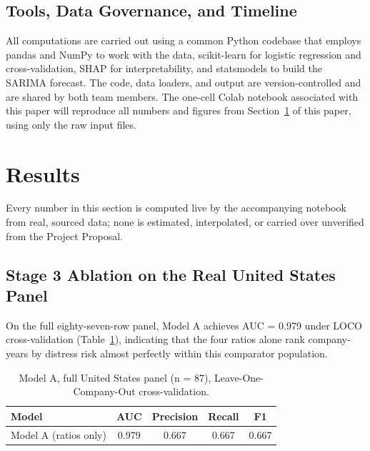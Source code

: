 \documentclass[final,1p,times]{elsarticle}
\begin{document}
\subsection{Tools, Data Governance, and Timeline}

All computations are carried out using a common Python codebase that employs pandas and NumPy to work with the data, scikit-learn for logistic regression and cross-validation, SHAP for interpretability, and statsmodels to build the SARIMA forecast. The code, data loaders, and output are version-controlled and are shared by both team members. The one-cell Colab notebook associated with this paper will reproduce all numbers and figures from Section~\ref{S:results} of this paper, using only the raw input files.


\section{Results}
\label{S:results}

Every number in this section is computed live by the accompanying notebook from real, sourced data; none is estimated, interpolated, or carried over unverified from the Project Proposal.

\subsection{Stage 3 Ablation on the Real United States Panel}
\label{S:results-ablation}

On the full eighty-seven-row panel, Model A achieves AUC = 0.979 under LOCO cross-validation (Table~\ref{tab:modelA-full}), indicating that the four ratios alone rank company-years by distress risk almost perfectly within this comparator population.

\begin{table}[h]
\centering
\small
\caption{Model A, full United States panel (n = 87), Leave-One-Company-Out cross-validation.}
\label{tab:modelA-full}
\begin{tabular}{lcccc}
\toprule
\textbf{Model} & \textbf{AUC} & \textbf{Precision} & \textbf{Recall} & \textbf{F1} \\
\midrule
Model A (ratios only) & 0.979 & 0.667 & 0.667 & 0.667 \\
\bottomrule
\end{tabular}
\end{table}
\end{document}
